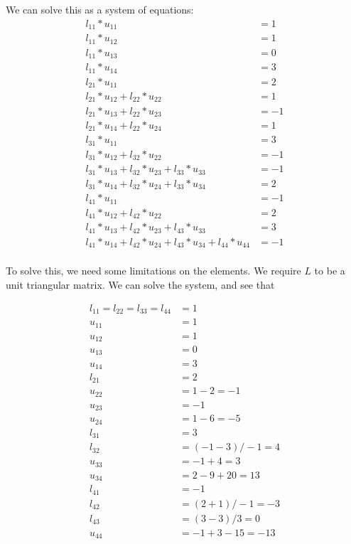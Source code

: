 We can solve this as a system of equations:
\begin{align*}
    l_{11} * u_{11} &= 1 \\
    l_{11} * u_{12} &= 1 \\
    l_{11} * u_{13} &= 0 \\
    l_{11} * u_{14} &= 3 \\
    l_{21} * u_{11} &= 2 \\
    l_{21} * u_{12} + l_{22} * u_{22} &= 1 \\
    l_{21} * u_{13} + l_{22} * u_{23} &= -1 \\
    l_{21} * u_{14} + l_{22} * u_{24} &= 1 \\
    l_{31} * u_{11} &= 3 \\
    l_{31} * u_{12} + l_{32} * u_{22} &= -1 \\
    l_{31} * u_{13} + l_{32} * u_{23} + l_{33} * u_{33} &= -1 \\
    l_{31} * u_{14} + l_{32} * u_{24} + l_{33} * u_{34} &= 2 \\
    l_{41} * u_{11} &= -1 \\
    l_{41} * u_{12} + l_{42} * u_{22} &= 2 \\
    l_{41} * u_{13} + l_{42} * u_{23} + l_{43} * u_{33} &= 3 \\
    l_{41} * u_{14} + l_{42} * u_{24} + l_{43} * u_{34} + l_{44} * u_{44} &= -1 \\
\end{align*}

To solve this, we need some limitations on the elements. We require $L$ to be a unit triangular matrix. We can solve the system, and see that

\begin{align*}
    l_{11} = l_{22} = l_{33} = l_{44} &= 1 \\
    u_{11} &= 1 \\
    u_{12} &= 1 \\
    u_{13} &= 0 \\
    u_{14} &= 3 \\
    l_{21} &= 2 \\
    u_{22} &= 1 - 2 = -1\\
    u_{23} &= -1 \\
    u_{24} &= 1 - 6 = -5 \\
    l_{31} &= 3 \\
    l_{32} &= (-1 - 3) / -1 = 4 \\
    u_{33} &= -1 + 4 = 3\\
    u_{34} &= 2 - 9 + 20 = 13 \\
    l_{41} &= -1 \\
    l_{42} &= (2 + 1) / -1 = -3 \\
    l_{43} &= (3 - 3) / 3 = 0 \\
    u_{44} &= -1 + 3 - 15 = -13 \\
\end{align*}

